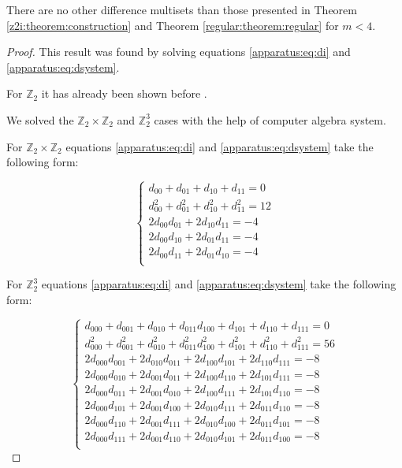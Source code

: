 \begin{theorem}
    There are no other difference multisets than those presented in Theorem \ref{z2i:theorem:construction} and Theorem \ref{regular:theorem:regular} for $m < 4$.
\end{theorem}

\begin{proof}
    This result was found by solving equations \eqref{apparatus:eq:di} and \eqref{apparatus:eq:dsystem}.
    
    For $\mathbb Z_2$ it has already been shown before \cite{buratti1999old}.
    
    We solved the $\mathbb Z_2 \times \mathbb Z_2$ and $\mathbb Z_2^3$ cases with the help of computer algebra system.
    
    For $\mathbb Z_2 \times \mathbb Z_2$ equations \eqref{apparatus:eq:di} and \eqref{apparatus:eq:dsystem} take the following form:
    
    \begin{equation}
        \begin{cases}
            d_{00} + d_{01} + d_{10} + d_{11} = 0 \\
            d_{00}^2 + d_{01}^2 + d_{10}^2 + d_{11}^2 = 12 \\
            2 d_{00}d_{01} + 2 d_{10}d_{11} = -4 \\
            2 d_{00}d_{10} + 2 d_{01}d_{11} = -4 \\
            2 d_{00}d_{11} + 2 d_{01}d_{10} = -4 \\
        \end{cases}
    \end{equation}
    
    For $\mathbb Z_2^3$ equations \eqref{apparatus:eq:di} and \eqref{apparatus:eq:dsystem} take the following form:
    
    \begin{equation}
        \begin{cases}
            d_{000} + d_{001} + d_{010} + d_{011} d_{100} + d_{101} + d_{110} + d_{111} = 0 \\
            d_{000}^2 + d_{001}^2 + d_{010}^2 + d_{011}^2 d_{100}^2 + d_{101}^2 + d_{110}^2 + d_{111}^2 = 56 \\
            2 d_{000}d_{001} + 2 d_{010}d_{011} + 2 d_{100}d_{101} + 2 d_{110}d_{111} = -8 \\
            2 d_{000}d_{010} + 2 d_{001}d_{011} + 2 d_{100}d_{110} + 2 d_{101}d_{111} = -8 \\
            2 d_{000}d_{011} + 2 d_{001}d_{010} + 2 d_{100}d_{111} + 2 d_{101}d_{110} = -8 \\
            2 d_{000}d_{101} + 2 d_{001}d_{100} + 2 d_{010}d_{111} + 2 d_{011}d_{110} = -8 \\
            2 d_{000}d_{110} + 2 d_{001}d_{111} + 2 d_{010}d_{100} + 2 d_{011}d_{101} = -8 \\
            2 d_{000}d_{111} + 2 d_{001}d_{110} + 2 d_{010}d_{101} + 2 d_{011}d_{100} = -8 \\
        \end{cases}
    \end{equation}
    

\end{proof}
